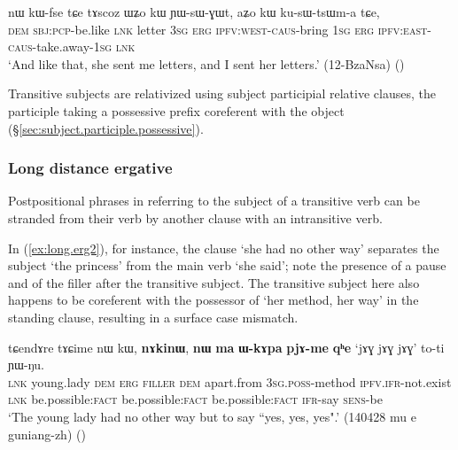 \begin{exe}
\ex \label{ex:WZo.kW.aZo.kW}
\gll nɯ kɯ-fse tɕe tɤscoz ɯʑo kɯ ɲɯ-sɯ-ɣɯt, aʑo kɯ ku-sɯ-tsɯm-a tɕe, \\
\textsc{dem} \textsc{sbj}:\textsc{pcp}-be.like \textsc{lnk} letter \textsc{3sg} \textsc{erg} \textsc{ipfv}:\textsc{west}-\textsc{caus}-bring \textsc{1sg} \textsc{erg} \textsc{ipfv}:\textsc{east}-\textsc{caus}-take.away-\textsc{1sg} \textsc{lnk} \\
\glt `And like that, she sent me letters, and I sent her letters.' (12-BzaNsa) ()
\end{exe}

Transitive subjects are relativized using subject  participial relative clauses, the participle taking a possessive prefix coreferent with the object (§\ref{sec:subject.participle.possessive}). 

\subsubsection{Long distance ergative} \label{sec:long.distance.kW}
Postpositional phrases in  referring to the subject of a transitive verb can be stranded from their verb by another clause with an intransitive verb. 

In (\ref{ex:long.erg2}), for instance, the clause   `she had no other way' separates the subject  `the princess' from the main verb  `she said'; note the presence of a pause and of the filler  after the transitive subject. The transitive subject here also happens to be coreferent with the possessor of  `her method, her way' in the standing clause, resulting in a surface case mismatch.

\begin{exe}
\ex \label{ex:long.erg2}
\gll  tɕendɤre tɤɕime nɯ kɯ, \textbf{nɤkinɯ}, \textbf{nɯ} \textbf{ma} \textbf{ɯ-kɤpa} \textbf{pjɤ-me} \textbf{qʰe} `jɤɣ jɤɣ jɤɣ' 	to-ti ɲɯ-ŋu. \\
\textsc{lnk} young.lady \textsc{dem} \textsc{erg} \textsc{filler} \textsc{dem}  apart.from \textsc{3sg}.\textsc{poss}-method \textsc{ipfv}.\textsc{ifr}-not.exist \textsc{lnk} be.possible:\textsc{fact} be.possible:\textsc{fact} be.possible:\textsc{fact} \textsc{ifr}-say \textsc{sens}-be \\
\glt `The young lady had no other way but to say ``yes, yes, yes".' (140428 mu e guniang-zh) ()
\end{exe}

